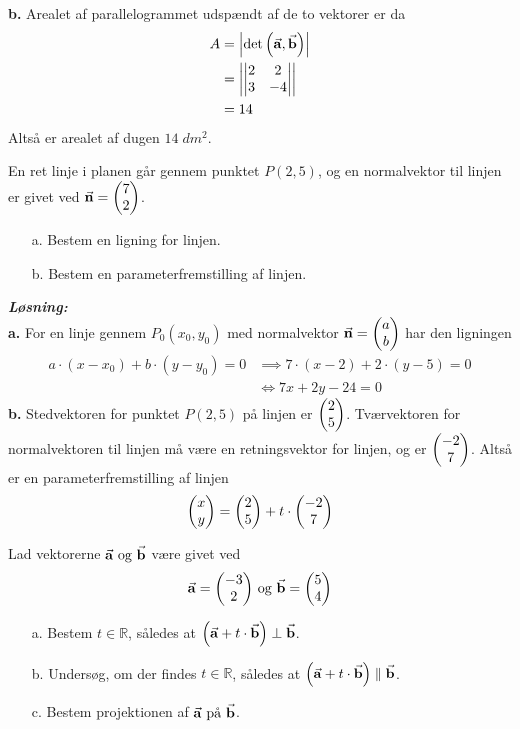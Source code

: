 \documentclass{article}
\newcommand{\sol}{\setlength{\parindent}{0cm}\textbf{\textit{Løsning:}}\setlength{\parindent}{1cm}}
\begin{document}
\textbf{b.}
Arealet af parallelogrammet udspændt af de to vektorer er da
\begin{equation*}
\begin{split}
  A&=\left| \det \left(\va{a}, \va{b} \right)  \right| \\ 
  &= \left| \mdet{2 & 2 \\ 3 & -4}  \right| \\ 
  &=14
\end{split}
\end{equation*}
Altså er arealet af dugen $14 \;\unit{dm^2} $.
\begin{question}{}{}
  En ret linje i planen går gennem punktet $P(2,5)$, og en normalvektor til linjen er givet ved $\va{n} =\mqty(7\\ 2) $. 
  \begin{itemize}
    \item[a.] Bestem en ligning for linjen.
    \item[b.] Bestem en parameterfremstilling af linjen.
  \end{itemize}
\end{question}
\sol \\
\textbf{a.}
For en linje gennem $P_0(x_0,y_0)$ med normalvektor $\va{n} =\mqty(a\\ b) $ har den ligningen 
\begin{equation*}
\begin{split}
  a \cdot \left(x-x_0\right) + b \cdot \left(y-y_0\right) =0 &\implies 7 \cdot \left(x-2\right) + 2 \cdot \left(y-5\right) =0 \\ 
  &\iff 7x + 2y -24 = 0
\end{split}
\end{equation*}
\textbf{b.}
Stedvektoren for punktet $P(2,5)$ på linjen er $\mqty(2\\ 5) $. Tværvektoren for normalvektoren til linjen må være en retningsvektor for linjen, og er $\mqty(-2\\ 7) $.
Altså er en parameterfremstilling af linjen
\[
\mqty(x\\ y) =\mqty(2\\ 5) + t \cdot \mqty(-2\\ 7) 
\] 
\begin{question}{}{}
  Lad vektorerne $\va{a} \text{ og } \va{b} $ være givet ved 
  \[
  \va{a} =\mqty(-3\\ 2) \text{ og } \va{b} = \mqty(5\\ 4) 
  \] 
  \begin{itemize}
    \item[a.] Bestem $t \in \mathbb{R}$, således at $\left(\va{a} + t \cdot \va{b} \right) \perp \va{b} $.
    \item[b.] Undersøg, om der findes $t \in \mathbb{R}$, således at $\left(\va{a} + t \cdot \va{b} \right) \parallel \va{b} $.
    \item[c.] Bestem projektionen af $\va{a} \text{ på } \va{b} $.
  \end{itemize}
\end{question}
\end{document}
